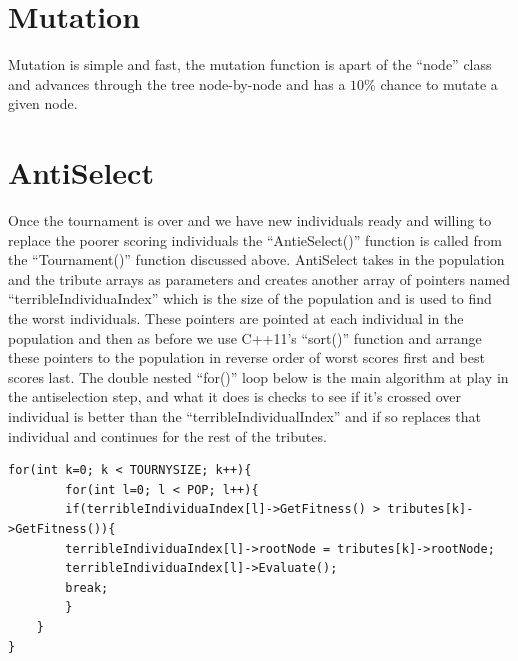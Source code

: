 \documentclass[twocolumn]{article}
\begin{document}
\section{Mutation}
Mutation is simple and fast, the mutation function is apart of the ``node'' class and advances through the tree node-by-node and has a $10\%$ chance to mutate a given node.

\section{AntiSelect}
Once the tournament is over and we have new individuals ready and willing to replace the poorer scoring individuals the ``AntieSelect()'' function is called from the ``Tournament()'' function discussed above. AntiSelect takes in the population and the tribute arrays as parameters and creates another array of pointers named ``terribleIndividuaIndex'' which is the size of the population and is used to find the worst individuals. These pointers are pointed at each individual in the population and then as before we use C++11's ``sort()'' function and arrange these pointers to the population in reverse order of worst scores first and best scores last. The double nested ``for()'' loop below is the main algorithm at play in the antiselection step, and what it does is checks to see if it's crossed over individual is better than the ``terribleIndividualIndex'' and if so replaces that individual and continues for the rest of the tributes.

\begin{lstlisting}[frame=single]
for(int k=0; k < TOURNYSIZE; k++){
		for(int l=0; l < POP; l++){
		if(terribleIndividuaIndex[l]->GetFitness() > tributes[k]->GetFitness()){
		terribleIndividuaIndex[l]->rootNode = tributes[k]->rootNode;
		terribleIndividuaIndex[l]->Evaluate();
		break;
		}
	}
}
\end{lstlisting}
\end{document}
